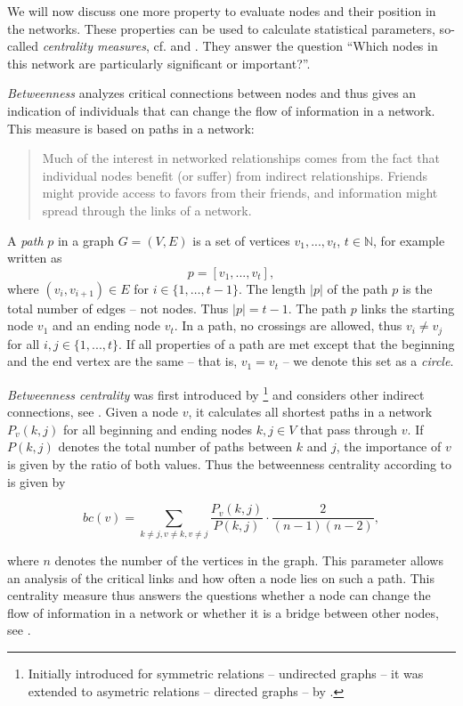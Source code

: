 We will now discuss one more property to evaluate nodes and their position in the networks. 
These properties can be used to calculate statistical parameters, so-called \emph{centrality measures}, cf. \cite{freeman1978centrality} and \cite{carrington2005models}. They answer the question ``Which nodes in this network are particularly significant or important?''.

\emph{Betweenness} analyzes critical connections between nodes and thus gives an indication of individuals that can change the flow of information in a network. This measure is based on paths in a network:

\begin{quote}
Much of the interest in networked relationships comes from the fact that individual
nodes benefit (or suffer) from indirect relationships. Friends might provide access
to favors from their friends, and information might spread through the links of
a network.\cite{Jackson2010}
\end{quote}
A \emph{path} $p$  in a graph $G=(V,E)$ is a set of vertices $v_1,...,v_t$, $t \in \mathbb{N}$, for example written as
\[p=[v_1,...,v_t],\] 
where $(v_i,v_{i+1})\in E$ for $i\in\{1,\ldots,t-1\}$. 
The length $|p|$ of the path $p$ is the total number of edges -- not nodes. Thus $|p|=t-1$. 
The path $p$ links the starting node $v_1$ and an ending node $v_t$. 
In a path, no crossings are allowed, thus $v_i\neq v_j$ for all $i,j\in \{1,...,t\}$. 
If all properties of a path are met except that the beginning and the end vertex are the same -- that is, $v_1 = v_t$ -- 
we denote this set as a \textit{circle}.

\emph{Betweenness centrality} was first introduced by \cite{freeman1977set}\footnote{Initially introduced for symmetric relations -- undirected graphs -- it was extended to asymetric relations -- directed graphs -- by \cite{white1994betweenness}.} and considers other indirect connections, see \cite{schweizer1996muster}. Given a node $v$, it calculates all shortest paths in a network $P_v(k,j)$ for all beginning and ending nodes $k,j\in V$ that pass through $v$. If $P(k,j)$ denotes the total number of paths between $k$ and $j$, the importance of $v$ is given by the ratio of both values. Thus the betweenness centrality according to \cite{Jackson2010} is given by

\[bc(v)= \sum_{k\neq j, v\neq k, v \neq j} \frac{P_v(k,j)}{P(k,j)} \cdot \frac{2}{(n-1)(n-2)},\] 

where $ n $ denotes the number of the vertices in the graph. 
This parameter allows an analysis of the critical links and how often a node lies on such a path. This centrality measure thus answers the questions whether a node can change the flow of information in a network or whether it is a bridge between other nodes, see \cite{schweizer1996muster}.


